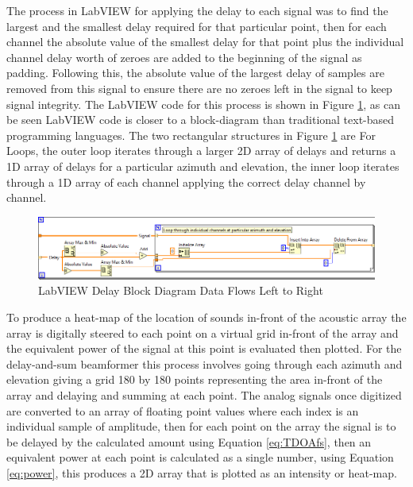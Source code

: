 \documentclass{UoNMCHA}
\numberwithin{equation}{section}
\begin{document}
    The process in LabVIEW for applying the delay to each signal was to find the largest and the smallest delay required for that particular point, then for each channel the absolute value of the smallest delay for that point plus the individual channel delay worth of zeroes are added to the beginning of the signal as padding. Following this, the absolute value of the largest delay of samples are removed from this signal to ensure there are no zeroes left in the signal to keep signal integrity. The LabVIEW code for this process is shown in Figure \ref{fig:DelayLabVIEW}, as can be seen LabVIEW code is closer to a block-diagram than traditional text-based programming languages. The two rectangular structures in Figure \ref{fig:DelayLabVIEW} are For Loops, the outer loop iterates through a larger 2D array of delays and returns a 1D array of delays for a particular azimuth and elevation, the inner loop iterates through a 1D array of each channel applying the correct delay channel by channel.
    
    \begin{figure} [H]
        \centering
        \includegraphics[keepaspectratio, width = \textwidth]{Figures/DelayBlockDiagram.png}
        \caption{LabVIEW Delay Block Diagram Data Flows Left to Right}
        \label{fig:DelayLabVIEW}
    \end{figure}
    
    To produce a heat-map of the location of sounds in-front of the acoustic array the array is digitally steered to each point on a virtual grid in-front of the array and the equivalent power of the signal at this point is evaluated then plotted. For the delay-and-sum beamformer this process involves going through each azimuth and elevation giving a grid 180 by 180 points representing the area in-front of the array and delaying and summing at each point. The analog signals once digitized are converted to an array of floating point values where each index is an individual sample of amplitude, then for each point on the array the signal is to be delayed by the calculated amount using Equation \ref{eq:TDOAfs}, then an equivalent power at each point is calculated as a single number, using Equation \ref{eq:power}, this produces a 2D array that is plotted as an intensity or heat-map.
   
\end{document}
